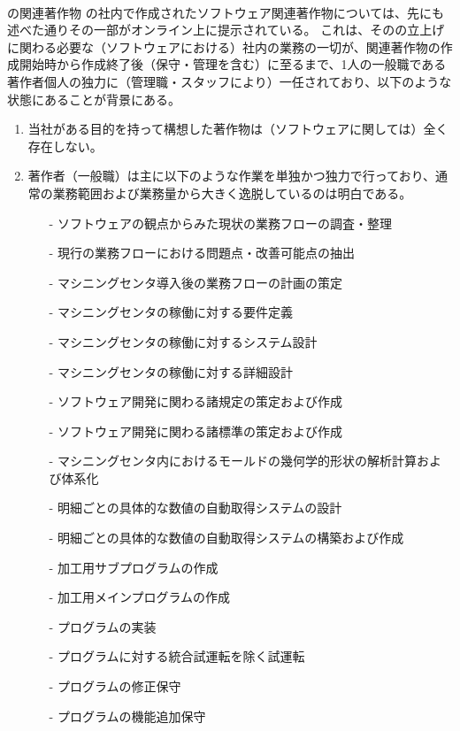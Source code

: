 \clearpage
~\vfill
\begin{Column}{\DMname の関連著作物}
\DMname の社内で作成されたソフトウェア関連著作物については、先にも述べた通りその一部がオンライン上に提示されている。
これは、その\DMname の立上げに関わる必要な（ソフトウェアにおける）社内の業務の一切が、関連著作物の作成開始時から作成終了後（保守・管理を含む）に至るまで、1人の一般職である著作者個人の独力に（管理職・スタッフにより）一任されており、以下のような状態にあることが背景にある。
\tcbline*
\begin{enumerate}[label=\Roman*]
\item 当社がある目的を持って構想した著作物は（ソフトウェアに関しては）全く存在しない。
\item
著作者（一般職）は主に以下のような作業を単独かつ独力で行っており、通常の業務範囲および業務量から大きく逸脱しているのは明白である。
  \begin{enumerate}
  \item[-] ソフトウェアの観点からみた現状の業務フローの調査・整理
  \item[-] 現行の業務フローにおける問題点・改善可能点の抽出
  \item[-] マシニングセンタ導入後の業務フローの計画の策定
  \item[-] マシニングセンタの稼働に対する要件定義
  \item[-] マシニングセンタの稼働に対するシステム設計
  \item[-] マシニングセンタの稼働に対する詳細設計
  \item[-] ソフトウェア開発に関わる諸規定の策定および作成
  \item[-] ソフトウェア開発に関わる諸標準の策定および作成
  \item[-] マシニングセンタ内におけるモールドの幾何学的形状の解析計算および体系化
  \item[-] 明細ごとの具体的な数値の自動取得システムの設計
  \item[-] 明細ごとの具体的な数値の自動取得システムの構築および作成
  \item[-] 加工用サブプログラムの作成
  \item[-] 加工用メインプログラムの作成
  \item[-] プログラムの実装
  \item[-] プログラムに対する統合試運転を除く試運転
  \item[-] プログラムの修正保守
  \item[-] プログラムの機能追加保守

\end{enumerate}
\end{enumerate}
\end{Column}
